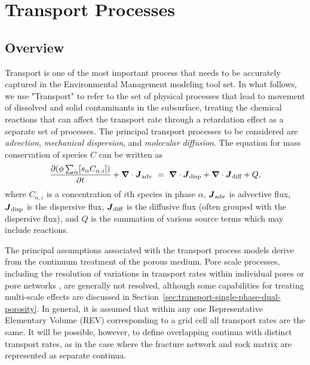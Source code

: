 %
%
%

\section{Transport Processes}    
\label{sec:transport-processes}

\subsection{Overview}

Transport is one of the most important process that needs to be accurately 
captured in the Environmental Management modeling tool set.  
In what follows, we use "Transport" to refer to the set of physical processes 
that lead to movement of dissolved and solid contaminants in the subsurface, 
treating the chemical reactions that can affect the transport 
rate through a retardation effect as a separate set of processes.  
The principal transport processes to be considered are 
\emph{advection}, \emph{mechanical dispersion}, and \emph{molecular diffusion}.  
The equation for mass conservation of species $C$ can be written as
$$\label{eq:concervation of mass general}
  \frac{\partial ( \phi \sum_\alpha [s_{\alpha} C_{\alpha,i}] )}{\partial t } +
  {\boldsymbol{\nabla}} \cdot {\boldsymbol{J}}_{\text{adv}} \ =\  {\boldsymbol{\nabla}} \cdot {\boldsymbol{J}}_{\text{disp}} + {\boldsymbol{\nabla}} \cdot {\boldsymbol{J}}_{\text{diff}} + Q,
$$
where $C_{\alpha,i}$ is a concentration of $i$th species in phase $\alpha$, 
${\boldsymbol{J}}_{\text{adv}}$ is advective flux, ${\boldsymbol{J}}_{\text{disp}}$ is the dispersive flux, 
${\boldsymbol{J}}_{\text{diff}}$ is the diffusive flux (often grouped with the dispersive flux), and  
$Q$ is the summation of various source terms which may include reactions.


The principal assumptions associated with the transport process models derive 
from the continuum treatment of the porous medium.  
Pore scale processes, including the resolution of variations in transport rates 
within individual pores or pore networks \citep{li2008scale,kang2006lattice,lichtner-kang-2007}, 
are generally not resolved, although some capabilities for treating multi-scale 
effects are discussed in Section~\ref{sec:transport-single-phase-dual-porosity}.  
In general, it is assumed that within any one Representative Elementary Volume (REV) 
corresponding to a grid cell all transport rates are the same.  
It will be possible, however, to define overlapping continua with distinct transport 
rates, as in the case where the fracture network and rock matrix are represented as separate continua.

